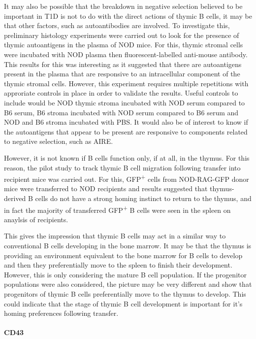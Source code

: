 It may also be possible that the breakdown in negative selection believed to be important in T1D is not to do with the direct actions of thymic B cells, it may be that other factors, such as autoantibodies are involved.
To investigate this, preliminary histology experiments were carried out to look for the presence of thymic autoantigens in the plasma of NOD mice.
For this, thymic stromal cells were incubated with NOD plasma then fluorescent-labelled anti-mouse antibody.
This results for this was interesting as it suggested that there are autoantigens present in the plasma that are responsive to an intracellular component of the thymic stromal cells.
However, this experiment requires multiple repetitions with approriate controls in place in order to validate the results.
Useful controls to include would be NOD thymic stroma incubated with NOD serum compared to B6 serum, B6 stroma incubated with NOD serum compared to B6 serum and NOD and B6 stroma incubated with PBS.
It would also be of interest to know if the autoantigens that appear to be present are responsive to components related to negative selection, such as AIRE.

However, it is not known if B cells function only, if at all, in the thymus.
For this reason, the pilot study to track thymic B cell migration following transfer into recipient mice was carried out.
For this, GFP\textsuperscript{+} cells from NOD-RAG-GFP donor mice were transferred to NOD recipients and results suggested that thymus-derived B cells do not have a strong homing instinct to return to the thymus, and in fact the majority of transferred GFP\textsuperscript{+} B cells were seen in the spleen on anaylsis of recipients.

This gives the impression that thymic B cells may act in a similar way to conventional B cells developing in the bone marrow.
It may be that the thymus is providing an environment equivalent to the bone marrow for B cells to develop and then they preferentially move to the spleen to finish their development.
However, this is only considering the mature B cell population.
If the progenitor populations were also considered, the picture  may be very different and show that progenitors of thymic B cells preferentially move to the thymus to develop.
This could indicate that the stage of thymic B cell development is important for it's homing preferences following transfer.

\paragraph{CD43}

